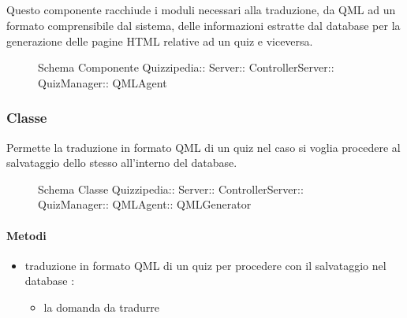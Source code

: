\subsection{}
Questo componente racchiude i moduli necessari alla traduzione, da QML ad un formato comprensibile dal sistema, delle informazioni estratte dal database per la generazione delle pagine HTML relative ad un quiz e viceversa.
\begin{figure}[H]
\centering
\noindent{}
\caption[Schema Componente Quizzipedia::Server::ControllerServer::QuizManager::QMLAgent]{Schema Componente Quizzipedia:: Server:: ControllerServer:: QuizManager:: QMLAgent}
\end{figure}
\subsubsection{Classe }
Permette la traduzione in formato QML di un quiz nel caso si voglia procedere al salvataggio dello stesso all'interno del database.
\begin{figure}[H]
\centering
\noindent{}
\caption[Schema Classe QMLGenerator]{Schema Classe Quizzipedia:: Server:: ControllerServer:: QuizManager:: QMLAgent:: QMLGenerator}
\end{figure}
\paragraph{Metodi}
\begin{itemize}
\item {}
\newline
traduzione in formato QML di un quiz per procedere con il salvataggio nel database
\newline
{} :
\begin{itemize}
\item {}
\newline
la domanda da tradurre
\end{itemize}
\end{itemize}
